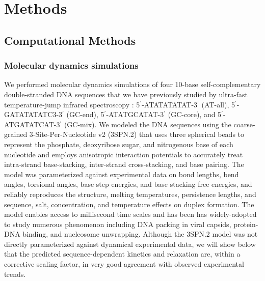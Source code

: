 \documentclass[journal=jpcbfk,manuscript=article]{achemso}
\begin{document}
\section{\label{sec:methods}Methods}

\subsection{Computational Methods}

\subsubsection{Molecular dynamics simulations}

We performed molecular dynamics simulations of four 10-base self-complementary double-stranded DNA sequences that we have previously studied by ultra-fast temperature-jump infrared spectroscopy \citep{Sanstead2016}: 5$^\prime$-ATATATATAT-3$^\prime$ (AT-all), 5$^\prime$-GATATATATC3-3$^\prime$ (GC-end), 5$^\prime$-ATATGCATAT-3$^\prime$ (GC-core), and  5$^\prime$-ATGATATCAT-3$^\prime$ (GC-mix). We modeled the DNA sequences using the coarse-grained 3-Site-Per-Nucleotide v2 (3SPN.2) that uses three spherical beads to represent the phosphate, deoxyribose sugar, and nitrogenous base of each nucleotide and employs anisotropic interaction potentials to accurately treat intra-strand base-stacking, inter-strand cross-stacking, and base pairing. \citep{Hinckley2013AnHybridization} The model was parameterized against experimental data on bond lengths, bend angles, torsional angles, base step energies, and base stacking free energies, and reliably reproduces the structure, melting temperatures, persistence lengths, and sequence, salt, concentration, and temperature effects on duplex formation. \citep{Hinckley2013AnHybridization} The model enables access to millisecond time scales and has been has widely-adopted to study numerous phenomenon including DNA packing in viral capsids, protein-DNA binding, and nucleosome unwrapping.\citep{Cordoba2017AIons, Lu2020OpenAWSEMSummary, Lequieu2016Tension-dependentUnwrapping} Although the 3SPN.2 model was not directly parameterized against dynamical experimental data, we will show below that the predicted sequence-dependent kinetics and relaxation are, within a corrective scaling factor, in very good agreement with observed experimental trends.
\end{document}
